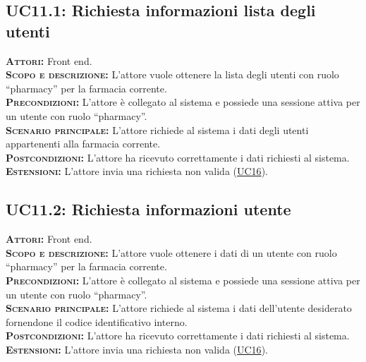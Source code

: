 \subsection{UC11.1: Richiesta informazioni lista degli utenti}
\label{sec:UC111}
\textsc{\textbf{Attori:}} Front end.\\
\textsc{\textbf{Scopo e descrizione:}} L'attore vuole ottenere la lista degli utenti con ruolo ``pharmacy'' per la farmacia corrente.\\
\textsc{\textsc{\textbf{Precondizioni:}}} L'attore è collegato al sistema e possiede una sessione attiva per un utente con ruolo ``pharmacy''.\\
\textsc{\textbf{Scenario principale:}} L'attore richiede al sistema i dati degli utenti appartenenti alla farmacia corrente.\\
\textsc{\textbf{Postcondizioni:}} L'attore ha ricevuto correttamente i dati richiesti al sistema.\\
\textsc{\textbf{Estensioni:}} L'attore invia una richiesta non valida (\hyperref[sec:UC16]{UC16}).

\subsection{UC11.2: Richiesta informazioni utente}
\label{sec:UC112}
\textsc{\textbf{Attori:}} Front end.\\
\textsc{\textbf{Scopo e descrizione:}} L'attore vuole ottenere i dati di un utente con ruolo ``pharmacy'' per la farmacia corrente.\\
\textsc{\textsc{\textbf{Precondizioni:}}} L'attore è collegato al sistema e possiede una sessione attiva per un utente con ruolo ``pharmacy''.\\
\textsc{\textbf{Scenario principale:}} L'attore richiede al sistema i dati dell'utente desiderato fornendone il codice identificativo interno.\\
\textsc{\textbf{Postcondizioni:}} L'attore ha ricevuto correttamente i dati richiesti al sistema.\\
\textsc{\textbf{Estensioni:}} L'attore invia una richiesta non valida (\hyperref[sec:UC16]{UC16}).

